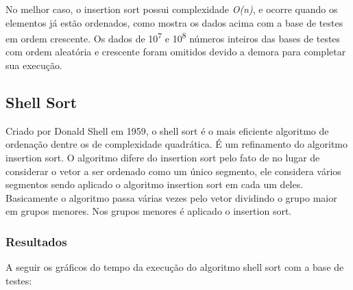 \documentclass[fleqn,10pt]{SelfArx} %
\begin{document}
No melhor caso, o insertion sort possui complexidade \emph{O(n)}, e ocorre quando os elementos já estão ordenados, como 
mostra os dados acima com a base de testes em ordem crescente. Os dados de 10\textsuperscript{7} e 
10\textsuperscript{8} números inteiros das bases de testes com ordem aleatória e crescente foram omitidos devido 
a demora para completar sua execução.

\subsection{Shell Sort}

Criado por Donald Shell em 1959, o shell sort é o mais eficiente algoritmo de ordenação dentre os de complexidade 
quadrática. É um refinamento do algoritmo insertion sort. O algoritmo difere do insertion sort pelo fato de no lugar de 
considerar o vetor a ser ordenado como um único segmento, ele considera vários segmentos sendo aplicado o algoritmo 
insertion sort em cada um deles. Basicamente o algoritmo passa várias vezes pelo vetor dividindo o grupo maior em grupos 
menores. Nos grupos menores é aplicado o insertion sort.

\subsubsection*{Resultados}

A seguir os gráficos do tempo da execução do algoritmo shell sort com a base de testes:\newline

{\setlength{\parindent}{-0.5em}
}\newline

{\setlength{\parindent}{-0.5em}
}\newline
\end{document}
